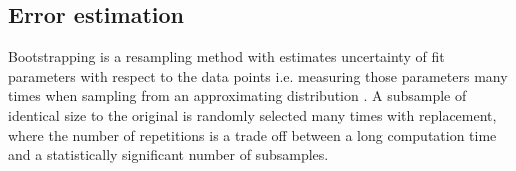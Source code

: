 \subsection{Error estimation}
Bootstrapping is a resampling method with estimates uncertainty of fit parameters with respect to the data points i.e. measuring those parameters many times when sampling from an approximating distribution \citep{efron_bootstrap_1979}. A subsample of identical size to the original is randomly selected many times with replacement, where the number of repetitions is a trade off between a long computation time and a statistically significant number of subsamples. 
\begin{figure}
	\label{bootstrap of scale length h}
\end{figure}
